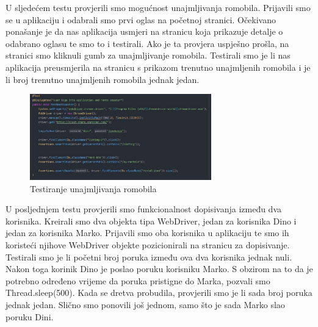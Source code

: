 			 
			 \indent U sljedećem testu provjerili smo mogućnost unajmljivanja romobila. Prijavili smo se u aplikaciju i odabrali smo prvi oglas na početnoj stranici. Očekivano ponašanje je da nas aplikacija usmjeri na stranicu koja prikazuje detalje o odabrano oglasu te smo to i testirali. Ako je ta provjera uspješno prošla, na stranici smo kliknuli gumb za unajmljivanje romobila. Testirali smo je li nas aplikacija preusmjerila  na stranicu s prikazom trenutno unajmljenih romobila i je li broj trenutno unajmljenih romobila jednak jedan.
			 
			 \begin{figure}[h]
			 	\centering
			 	\includegraphics[width=0.7\textwidth]{slike/selenium_test_2.jpg}
			 	\caption{Testiranje unajmljivanja romobila}
			 	\label{fig:Testiranje unajmljivanja romobila}
			 \end{figure}
			 
			 \indent U posljednjem testu provjerili smo funkcionalnost dopisivanja između dva korisnika. Kreirali smo dva objekta tipa WebDriver, jedan za korisnika Dino i jedan za korisnika Marko. Prijavili smo oba korisnika u aplikaciju te smo ih koristeći njihove WebDriver objekte pozicionirali na stranicu za dopisivanje. Testirali smo je li početni broj poruka između ova dva korisnika jednak nuli. Nakon toga korinik Dino je poslao poruku korisniku Marko. S obzirom na to da je potrebno određeno vrijeme da poruka pristigne do Marka, pozvali smo Thread.sleep(500). Kada se dretva probudila, provjerili smo je li sada broj poruka jednak jedan. Slično smo ponovili još jednom, samo što je sada Marko slao poruku Dini.
			 
